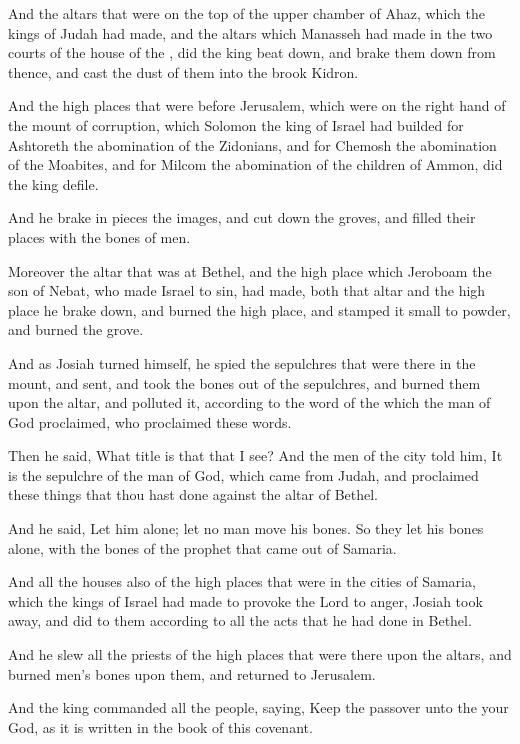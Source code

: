 \Verse And the altars that were on the top of the upper chamber of Ahaz, which the kings of Judah had made, and the altars which Manasseh had made in the two courts of the house of the \LORD, did the king beat down, and brake them down from thence, and cast the dust of them into the brook Kidron.

\Verse And the high places that were before Jerusalem, which were on the right hand of the mount of corruption, which Solomon the king of Israel had builded for Ashtoreth the abomination of the Zidonians, and for Chemosh the abomination of the Moabites, and for Milcom the abomination of the children of Ammon, did the king defile.

\Verse And he brake in pieces the images, and cut down the groves, and filled their places with the bones of men.

\Verse Moreover the altar that was at Bethel, and the high place which Jeroboam the son of Nebat, who made Israel to sin, had made, both that altar and the high place he brake down, and burned the high place, and stamped it small to powder, and burned the grove.

\Verse And as Josiah turned himself, he spied the sepulchres that were there in the mount, and sent, and took the bones out of the sepulchres, and burned them upon the altar, and polluted it, according to the word of the \LORD which the man of God proclaimed, who proclaimed these words.

\Verse Then he said, What title is that that I see? And the men of the city told him, It is the sepulchre of the man of God, which came from Judah, and proclaimed these things that thou hast done against the altar of Bethel.

\Verse And he said, Let him alone; let no man move his bones. So they let his bones alone, with the bones of the prophet that came out of Samaria.

\Verse And all the houses also of the high places that were in the cities of Samaria, which the kings of Israel had made to provoke the Lord to anger, Josiah took away, and did to them according to all the acts that he had done in Bethel.

\Verse And he slew all the priests of the high places that were there upon the altars, and burned men's bones upon them, and returned to Jerusalem.

\Verse And the king commanded all the people, saying, Keep the passover unto the \LORD your God, as it is written in the book of this covenant.

